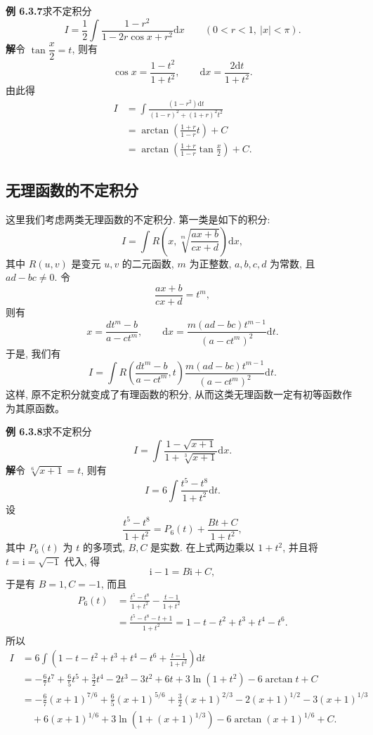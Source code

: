 \documentclass[UTF8, 12pt, fontset=fandol, oneside]{ctexart}
\begin{document}
\noindent\textbf{例 6.3.7}\quad 求不定积分
\[
  I=\frac12\int\frac{1-r^2}{1-2r\cos x+r^2}\mathrm dx
  \qquad(0<r<1,\ |x|<\pi).
\]
\noindent\textbf{解}\quad 令 $\tan\dfrac x2=t$, 则有
\[
  \cos x=\frac{1-t^2}{1+t^2},\qquad
  \mathrm dx=\frac{2\mathrm dt}{1+t^2}.
\]
由此得
\[
\begin{aligned}
  I
  &=
  \int\frac{(1-r^2)\mathrm dt}{(1-r)^2+(1+r)^2t^2}\\
  &=
  \arctan\left(\frac{1+r}{1-r}t\right)+C\\
  &=
  \arctan\left(\frac{1+r}{1-r}\tan\frac x2\right)+C.
\end{aligned}
\]

\subsection{无理函数的不定积分}

这里我们考虑两类无理函数的不定积分. 第一类是如下的积分:
\[
  I=\int R\left(x,\sqrt[m]{\frac{ax+b}{cx+d}}\right)\mathrm dx,
\]
其中 $R(u,v)$ 是变元 $u,v$ 的二元函数, $m$ 为正整数, $a,b,c,d$ 为常数, 且 $ad-bc\ne0$. 令
\[
  \frac{ax+b}{cx+d}=t^m,
\]
则有
\[
  x=\frac{dt^m-b}{a-ct^m},\qquad
  \mathrm dx=\frac{m(ad-bc)t^{m-1}}{(a-ct^m)^2}\mathrm dt.
\]
于是, 我们有
\[
  I=
  \int R\left(\frac{dt^m-b}{a-ct^m},t\right)
  \frac{m(ad-bc)t^{m-1}}{(a-ct^m)^2}\mathrm dt.
\]
这样, 原不定积分就变成了有理函数的积分, 从而这类无理函数一定有初等函数作为其原函数。

\noindent\textbf{例 6.3.8}\quad 求不定积分
\[
  I=\int\frac{1-\sqrt{x+1}}{1+\sqrt[3]{x+1}}\mathrm dx.
\]
\noindent\textbf{解}\quad 令 $\sqrt[6]{x+1}=t$, 则有
\[
  I=6\int\frac{t^5-t^8}{1+t^2}\mathrm dt.
\]
设
\[
  \frac{t^5-t^8}{1+t^2}=P_6(t)+\frac{Bt+C}{1+t^2},
\]
其中 $P_6(t)$ 为 $t$ 的多项式, $B,C$ 是实数. 在上式两边乘以 $1+t^2$, 并且将 $t=\mathrm i=\sqrt{-1}$ 代入, 得
\[
  \mathrm i-1=B\mathrm i+C,
\]
于是有 $B=1,C=-1$, 而且
\[
\begin{aligned}
  P_6(t)
  &=
  \frac{t^5-t^8}{1+t^2}-\frac{t-1}{1+t^2}\\
  &=
  \frac{t^5-t^8-t+1}{1+t^2}
  =
  1-t-t^2+t^3+t^4-t^6.
\end{aligned}
\]
所以
\[
\begin{aligned}
  I
  &=
  6\int\left(1-t-t^2+t^3+t^4-t^6+\frac{t-1}{1+t^2}\right)\mathrm dt\\
  &=
  -\frac67t^7+\frac65t^5+\frac32t^4-2t^3-3t^2+6t
  +3\ln(1+t^2)-6\arctan t+C\\
  &=
  -\frac67(x+1)^{7/6}+\frac65(x+1)^{5/6}
  +\frac32(x+1)^{2/3}-2(x+1)^{1/2}-3(x+1)^{1/3}\\
  &\quad+
  6(x+1)^{1/6}+3\ln\left(1+(x+1)^{1/3}\right)
  -6\arctan(x+1)^{1/6}+C.
\end{aligned}
\]
\end{document}
